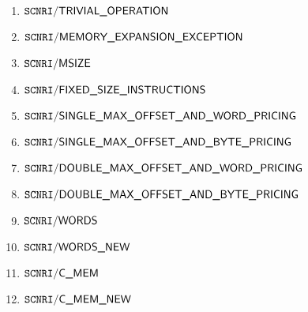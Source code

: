 \begin{enumerate}
	\item $\mxpScenarioTrivialOperation              $
	\item $\mxpScenarioMemoryExpansionException      $
	\item $\mxpScenarioMsize                         $
	\item $\mxpScenarioFixedSizeInstructions         $ 
	\item $\mxpScenarioSingleMaxOffsetAndWordPricing $
	\item $\mxpScenarioSingleMaxOffsetAndBytePricing $
	\item $\mxpScenarioDoubleMaxOffsetAndWordPricing $
	\item $\mxpScenarioDoubleMaxOffsetAndBytePricing $
	\item $\mxpScenarioWords                         $
	\item $\mxpScenarioWordsNew                      $
	\item $\mxpScenarioCmem                          $
	\item $\mxpScenarioCmemNew                       $
\end{enumerate}

